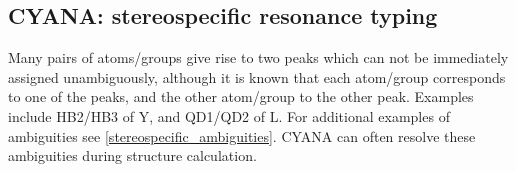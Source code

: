 \subsection*{CYANA: stereospecific resonance typing}
Many pairs of atoms/groups give rise to two peaks which can not be immediately
assigned unambiguously, although it is known that each atom/group corresponds 
to one of the peaks, and the other atom/group to the other peak.
Examples include HB2/HB3 of Y, and QD1/QD2 of L.
For additional examples of ambiguities see \ref{stereospecific_ambiguities}.
CYANA can often resolve these ambiguities during structure calculation.



